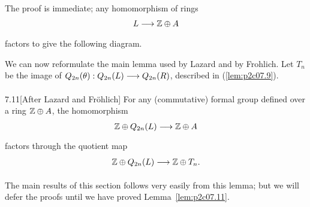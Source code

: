 \documentclass[../main]{subfiles}
\begin{document}
The proof is immediate; any homomorphism of rings \[L \lar{} \bZ \oplus A\] factors to give the following diagram.

\begin{center}
\end{center}

We can now reformulate the main lemma used by Lazard and by Frohlich. Let $T_n$ be the image of $Q_{2n}(\theta) : Q_{2n}(L) \lar{} Q_{2n}(R)$, described in (\ref{lem:p2c07.9}).

\begin{customlemma}{7.11}[After Lazard and Fröhlich]
\label{lem:p2c07.11}
For any (commutative) formal group defined over a ring $\mathbb{Z} \oplus A$, the homomorphism \[\bZ \oplus Q_{2n}(L) \lar{} \bZ \oplus A\] factors through the quotient map \[\bZ \oplus Q_{2n}(L) \lar{} \bZ \oplus T_n.\]
\end{customlemma}

The main results of this section follows very easily from this lemma; but we will defer the proofs until we have proved Lemma~\ref{lem:p2c07.11}. 
\end{document}
